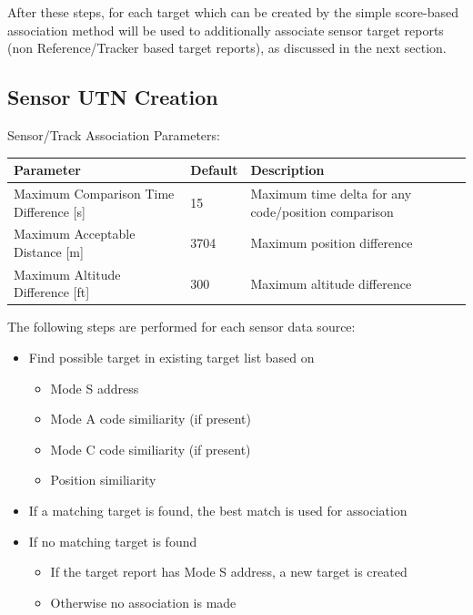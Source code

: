 After these steps, for each target which can be created by the simple score-based association method will be used to additionally associate sensor target reports (non Reference/Tracker based target reports), as discussed in the next section.

\subsection{Sensor UTN Creation}

Sensor/Track Association Parameters:
\begin{table}[H]
  \center
  \begin{tabularx}{\textwidth}{ | l | l | X |}
    \hline
    \textbf{Parameter} & \textbf{Default} &  \textbf{Description} \\ \hline
    Maximum Comparison Time Difference [s] & 15 & Maximum time delta for any code/position comparison \\ \hline
    Maximum Acceptable Distance [m] & 3704 & Maximum position difference \\ \hline
    Maximum Altitude Difference [ft] & 300 & Maximum altitude difference \\ \hline
  \end{tabularx}
\end{table}    

The following steps are performed for each sensor data source:
\begin{itemize}
\item Find possible target in existing target list based on
\begin{itemize}
\item Mode S address
\item Mode A code similiarity (if present)
\item Mode C code similiarity (if present)
\item Position similiarity
\end{itemize}
\item If a matching target is found, the best match is used for association
\item If no matching target is found
\begin{itemize}
\item If the target report has Mode S address, a new target is created
\item Otherwise no association is made
\end{itemize}
\end{itemize}
\ \\

